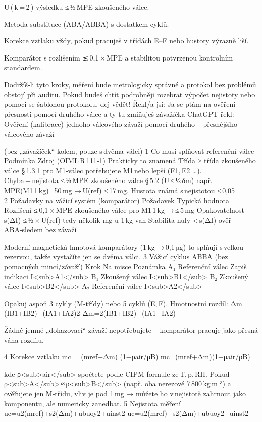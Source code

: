     U ( k = 2 ) výsledku ≤ ⅓ MPE zkoušeného válce.

    Metoda substituce (ABA/ABBA) s dostatkem cyklů.

    Korekce vztlaku vždy, pokud pracuješ v třídách E–F nebo hustoty výrazně liší.

    Komparátor s rozlišením ≲ 0,1 × MPE a stabilitou potvrzenou kontrolním standardem.

Dodržíš‑li tyto kroky, měření bude metrologicky správné a protokol bez problémů obstojí při auditu. Pokud budeš chtít podrobněji rozebrat výpočet nejistoty nebo pomoci se šablonou protokolu, dej vědět!
Řekl/a jsi:
Ja se ptám na ověření přesnosti pomocí druhého válce a ty tu zmiňuješ závažíčka
ChatGPT řekl:
Ověření (kalibrace) jednoho válcového závaží pomocí druhého – přesnějšího – válcového závaží

(bez „závažíček“ kolem, pouze s dvěma válci)
1  Co musí splňovat referenční válec
Podmínka	Zdroj (OIML R 111‑1)	Prakticky to znamená
Třída ≥ třída zkoušeného válce	§ 1.3.1	pro M1‑válec potřebujete M1 nebo lepší (F1, E2 …).
Chyba + nejistota ≤ ⅓ MPE zkoušeného válce	§ 5.2 (U ≤ ⅓ δm)	např. MPE(M1 1 kg)=50 mg → U(ref) ≤ 17 mg.
Hustota známá s nejistotou ≤ 0,05 %
2  Požadavky na vážicí systém (komparátor)
Požadavek	Typická hodnota
Rozlišení ≤ 0,1 × MPE zkoušeného válce	pro M1 1 kg → ≤ 5 mg
Opakovatelnost s(ΔI) ≤ ⅓ × U(ref)	tedy několik mg u 1 kg vah
Stabilita nuly < s(ΔI)	ověř ABA‑sledem bez závaží

Moderní magnetická hmotová komparátory (1 kg → 0,1 µg) to splňují s velkou rezervou, takže vystačíte jen se dvěma válci.
3  Vážicí cyklus ABBA (bez pomocných mincí/závaží)
Krok	Na misce	Poznámka
A₁	Referenční válec	Zapiš indikaci I<sub>A1</sub>
B₁	Zkoušený válec	I<sub>B1</sub>
B₂	Zkoušený válec	I<sub>B2</sub>
A₂	Referenční válec	I<sub>A2</sub>

Opakuj aspoň 3 cykly (M‑třídy) nebo 5 cyklů (E, F).
Hmotnostní rozdíl:
Δm  =  (IB1+IB2)−(IA1+IA2)2
Δm=2(IB1​+IB2​)−(IA1​+IA2​)​

    Žádné jemné „dohazovací“ závaží nepotřebujete – komparátor pracuje jako přesná váha rozdílu.

4  Korekce vztlaku
mc  =  (mref+Δm)  (1−ρair/ρB)
mc​=(mref​+Δm)(1−ρair​/ρB​)

kde ρ<sub>air</sub> spočtete podle CIPM‑formule ze T, p, RH.
Pokud ρ<sub>A</sub> ≈ ρ<sub>B</sub> (např. oba nerezové 7 800 kg m⁻³) a ověřujete jen M‑třídu, vliv je pod 1 mg → můžete ho v nejistotě zahrnout jako komponentu, ale numericky zanedbat.
5  Nejistota měření
uc=u2(mref)+s2(Δm)+ubuoy2+uinst2
uc​=u2(mref​)+s2(Δm)+ubuoy2​+uinst2​
​

